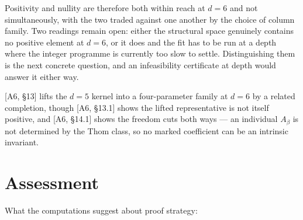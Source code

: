 \documentclass[11pt,a4paper]{article}
\theoremstyle{plain}
\theoremstyle{definition}
\theoremstyle{remark}
\begin{document}
Positivity and nullity are therefore both within reach at $d = 6$ and not simultaneously, with
the two traded against one another by the choice of column family. Two readings remain open:
either the structural space genuinely contains no positive element at $d = 6$, or it does and
the fit has to be run at a depth where the integer programme is currently too slow to settle.
Distinguishing them is the next concrete question, and an infeasibility certificate at depth
would answer it either way.

[A6, \S13] lifts the $d = 5$ kernel into a four-parameter family at $d = 6$ by a related
completion, though [A6, \S13.1] shows the lifted representative is not itself positive, and
[A6, \S14.1] shows the freedom cuts both ways --- an individual $A_\beta$ is not determined by
the Thom class, so no marked coefficient can be an intrinsic invariant.

\section{Assessment}
\label{sec:assessment}

What the computations suggest about proof strategy:
\end{document}
